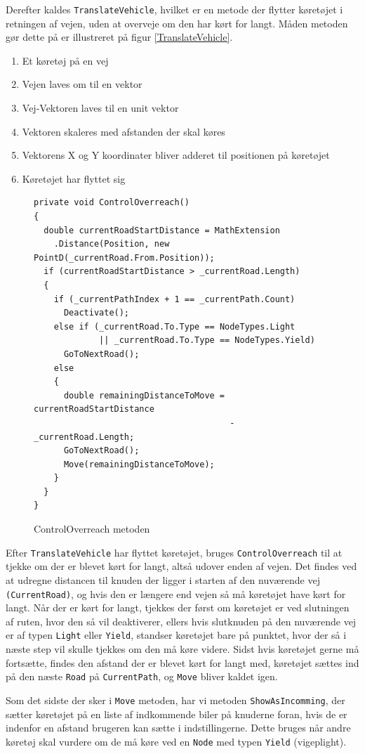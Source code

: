 \vspace{5mm}

Derefter kaldes \texttt{TranslateVehicle}, hvilket er en metode der flytter køretøjet i retningen af vejen, uden at overveje om den har kørt for langt. Måden metoden gør dette på er illustreret på figur \ref{TranslateVehicle}.

\begin{enumerate}
\item Et køretøj på en vej
\item Vejen laves om til en vektor
\item Vej-Vektoren laves til en unit vektor
\item Vektoren skaleres med afstanden der skal køres
\item Vektorens X og Y koordinater bliver adderet til positionen på køretøjet
\item Køretøjet har flyttet sig
\end{enumerate}

\begin{figure}[H]
\begin{lstlisting}
private void ControlOverreach()
{
  double currentRoadStartDistance = MathExtension
    .Distance(Position, new PointD(_currentRoad.From.Position));
  if (currentRoadStartDistance > _currentRoad.Length)
  {
    if (_currentPathIndex + 1 == _currentPath.Count)
      Deactivate();
    else if (_currentRoad.To.Type == NodeTypes.Light 
             || _currentRoad.To.Type == NodeTypes.Yield)
      GoToNextRoad();
    else
    {
      double remainingDistanceToMove = currentRoadStartDistance 
                                       - _currentRoad.Length;
      GoToNextRoad();
      Move(remainingDistanceToMove);
    }
  }
}
\end{lstlisting}
\caption{ControlOverreach metoden}\label{ControlOverreachCode}
\end{figure}

Efter \texttt{TranslateVehicle} har flyttet køretøjet, bruges \texttt{ControlOverreach} til at tjekke om der er blevet kørt for langt, altså udover enden af vejen. Det findes ved at udregne distancen til knuden der ligger i starten af den nuværende vej \texttt{(CurrentRoad)}, og hvis den er længere end vejen så må køretøjet have kørt for langt. Når der er kørt for langt, tjekkes der først om køretøjet er ved slutningen af ruten, hvor den så vil deaktiverer, ellers hvis slutknuden på den nuværende vej er af typen \texttt{Light} eller \texttt{Yield}, standser køretøjet bare på punktet, hvor der så i næste step vil skulle tjekkes om den må køre videre. Sidst hvis køretøjet gerne må fortsætte, findes den afstand der er blevet kørt for langt med, køretøjet sættes ind på den næste \texttt{Road} på \texttt{CurrentPath}, og \texttt{Move} bliver kaldet igen.

\vspace{5mm}

Som det sidste der sker i \texttt{Move} metoden, har vi metoden \texttt{ShowAsIncomming}, der sætter køretøjet på en liste af indkommende biler på knuderne foran, hvis de er indenfor en afstand brugeren kan sætte i indstillingerne. Dette bruges når andre køretøj skal vurdere om de må køre ved en \texttt{Node} med typen \texttt{Yield} (vigeplight).